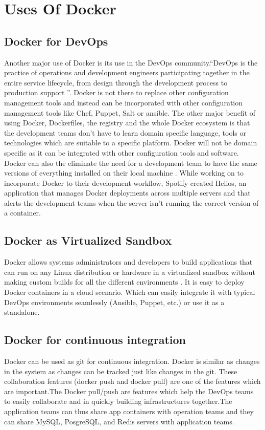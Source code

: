 \documentclass[9pt,twocolumn,twoside]{../../styles/osajnl}
\begin{document}
\section{Uses Of Docker}

\subsection{Docker for DevOps}
Another major use of Docker is its use in the DevOps
community.``DevOps is the practice of operations and development
engineers participating together in the entire service lifecycle, from
design through the development process to production
support \cite{www-devops}''. Docker is not there to replace other
configuration management tools and instead can be incorporated with
other configuration management tools like Chef, Puppet, Salt or
ansible. The other major benefit of using Docker, Dockerfiles, the
registry and the whole Docker ecosystem is that the development teams
don't have to learn domain specific language, tools or technologies
which are suitable to a specific platform. Docker will
not be domain specific as it can be integrated with other
configuration tools and software. Docker can
also the eliminate the need for a development team to have the same
versions of everything installed on their local
machine \cite{www-docker-1}. While working on to incorporate Docker to
their development workflow, Spotify created Helios, an application that
manages Docker deployments across multiple servers and that alerts the
development teams when the server isn't running the correct version of
a container.

\subsection{Docker as Virtualized Sandbox}
Docker allows systems administrators and developers to build
applications that can run on any Linux distribution or hardware in a
virtualized sandbox without making custom builds for all the different
environments \cite{www-docker-1}. It is easy to deploy Docker
containers in a cloud scenario. Which can easily integrate it with
typical DevOps environments seamlessly (Ansible, Puppet, etc.) or use
it as a standalone.

\subsection{Docker for continuous integration}
Docker can be used as git for continuous integration. Docker is
similar as changes in the system as changes can be tracked just like
changes in the git. These collaboration features (docker push and
docker pull) are one of the features which are important.The Docker
pull/push are features which help the DevOps teams to easily
collaborate and in quickly building infrastructures together.The
application teams can thus share app containers with operation teams
and they can share MySQL, PosgreSQL, and Redis servers with
application teams\cite{www-docker-2}.
\end{document}
